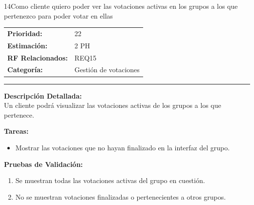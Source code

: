 \begin{hu_card}{14}{Como cliente quiero poder ver las votaciones activas en los grupos a los que pertenezco para poder votar en ellas}
    \begin{tabularx}{\linewidth}{l X}
        \textbf{Prioridad:}   & 22\\
        \textbf{Estimación:}  & 2 PH \\
        \textbf{RF Relacionados:} & REQ15 \\
        \textbf{Categoría:} & Gestión de votaciones \\
    \end{tabularx}

    \vspace{2mm}
    \hrule
    \vspace{2mm}

    \textbf{Descripción Detallada:} \\
    Un cliente podrá visualizar las votaciones activas de los grupos a los que pertenece.

    \vspace{2mm}
    \textbf{Tareas:}
    \begin{itemize}[noitemsep, topsep=0pt]
        \item Mostrar las votaciones que no hayan finalizado en la interfaz del grupo.
    \end{itemize}

    \vspace{2mm}
    \textbf{Pruebas de Validación:}
    \begin{enumerate}[noitemsep, topsep=0pt]
        \item Se muestran todas las votaciones activas del grupo en cuestión.
        \item No se muestran votaciones finalizadas o pertenecientes a otros grupos.
    \end{enumerate}
\end{hu_card}

